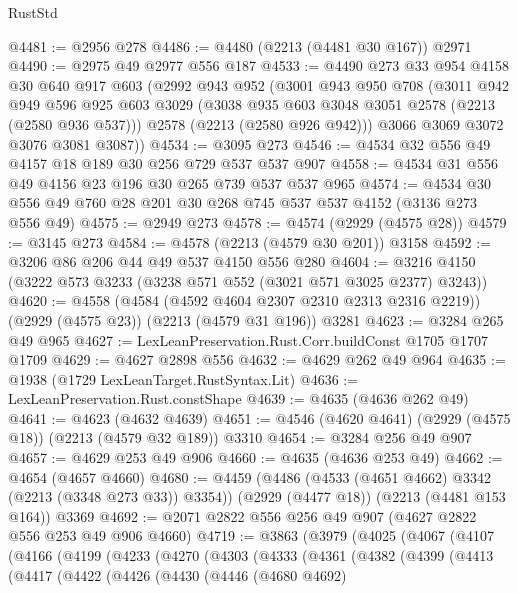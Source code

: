 \begin{lexlean}{RustStd}
\begin{coremodule}
@4481 := @2956 @278
@4486 := @4480 (@2213 (@4481 @30 @167)) @2971
@4490 := @2975 @49 @2977 @556 @187
@4533 := @4490
    @273
    @33
    @954
    @4158
    @30
    @640
    @917
    @603
    (@2992
      @943
      @952
      (@3001
        @943
        @950
        @708
        (@3011
          @942
          @949
          @596
          @925
          @603
          @3029
          (@3038 @935 @603 @3048 @3051 @2578 (@2213 (@2580 @936 @537)))
          @2578
          (@2213 (@2580 @926 @942)))
        @3066
        @3069
        @3072
        @3076
        @3081
        @3087))
@4534 := @3095 @273
@4546 := @4534 @32 @556 @49 @4157 @18 @189 @30 @256 @729 @537 @537 @907
@4558 := @4534 @31 @556 @49 @4156 @23 @196 @30 @265 @739 @537 @537 @965
@4574 := @4534 @30 @556 @49 @760 @28 @201 @30 @268 @745 @537 @537 @4152 (@3136 @273 @556 @49)
@4575 := @2949 @273
@4578 := @4574 (@2929 (@4575 @28))
@4579 := @3145 @273
@4584 := @4578 (@2213 (@4579 @30 @201)) @3158
@4592 := @3206 @86 @206 @44 @49 @537 @4150 @556 @280
@4604 := @3216 @4150 (@3222 @573 @3233 (@3238 @571 @552 (@3021 @571 @3025 @2377) @3243))
@4620 := @4558
    (@4584 (@4592 @4604 @2307 @2310 @2313 @2316 @2219))
    (@2929 (@4575 @23))
    (@2213 (@4579 @31 @196))
    @3281
@4623 := @3284 @265 @49 @965
@4627 := LexLeanPreservation.Rust.Corr.buildConst @1705 @1707 @1709
@4629 := @4627 @2898 @556
@4632 := @4629 @262 @49 @964
@4635 := @1938 (@1729 LexLeanTarget.RustSyntax.Lit)
@4636 := LexLeanPreservation.Rust.constShape
@4639 := @4635 (@4636 @262 @49)
@4641 := @4623 (@4632 @4639)
@4651 := @4546 (@4620 @4641) (@2929 (@4575 @18)) (@2213 (@4579 @32 @189)) @3310
@4654 := @3284 @256 @49 @907
@4657 := @4629 @253 @49 @906
@4660 := @4635 (@4636 @253 @49)
@4662 := @4654 (@4657 @4660)
@4680 := @4459
    (@4486 (@4533 (@4651 @4662) @3342 (@2213 (@3348 @273 @33)) @3354))
    (@2929 (@4477 @18))
    (@2213 (@4481 @153 @164))
    @3369
@4692 := @2071 @2822 @556 @256 @49 @907 (@4627 @2822 @556 @253 @49 @906 @4660)
@4719 := @3863
    (@3979
      (@4025
        (@4067
          (@4107
            (@4166
              (@4199
                (@4233
                  (@4270
                    (@4303
                      (@4333
                        (@4361
                          (@4382
                            (@4399
                              (@4413
                                (@4417
                                  (@4422
                                    (@4426
                                      (@4430
                                        (@4446
                                          (@4680 @4692)

\end{coremodule}
\end{lexlean}
